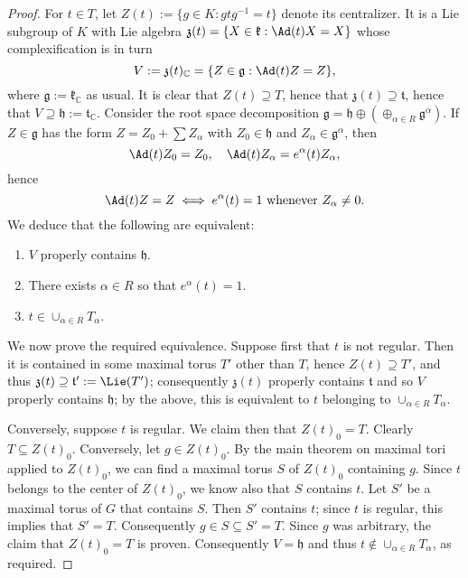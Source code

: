 \documentclass[reqno]{amsart} 
\begin{document}
\begin{proof}
  For $t \in T$, let $Z(t) := \{g \in K : g t g^{-1} = t\}$ denote its centralizer.  It is a Lie subgroup of $K$ with Lie algebra $\mathfrak{z}(t) = \{X \in \mathfrak{k} : \Ad(t)X = X\}$ whose complexification is in turn
  \begin{equation*}
    V := \mathfrak{z}(t)_\mathbb{C} = \{Z \in \mathfrak{g} : \Ad(t)Z = Z\},
  \end{equation*}
  where $\mathfrak{g} := \mathfrak{k}_\mathbb{C}$ as usual.  It is clear that $Z(t) \supseteq T$, hence that $\mathfrak{z}(t) \supseteq \mathfrak{t}$, hence that $V \supseteq \mathfrak{h} := \mathfrak{t}_\mathbb{C}$.  Consider the root space decomposition $\mathfrak{g} = \mathfrak{h} \oplus (\oplus_{\alpha \in R} \mathfrak{g}^\alpha)$.  If $Z \in \mathfrak{g}$ has the form $Z = Z_0 + \sum Z_\alpha$ with $Z_0 \in \mathfrak{h}$ and $Z_\alpha \in \mathfrak{g}^\alpha$, then
  \begin{equation*}
    \Ad(t) Z_0 = Z_0, \quad \Ad(t) Z_\alpha = e^\alpha(t) Z_\alpha,
  \end{equation*}
  hence
  \begin{equation*}
    \Ad(t) Z = Z \iff e^\alpha(t) = 1 \text{ whenever } Z_\alpha \neq 0.
  \end{equation*}
  We deduce that the following are equivalent:
  \begin{enumerate}
  \item $V$ properly contains $\mathfrak{h}$.
  \item There exists $\alpha \in R$ so that $e^\alpha(t) = 1$.
  \item $t \in \cup_{\alpha \in R} T_\alpha$.
  \end{enumerate}

  We now prove the required equivalence.  Suppose first that $t$ is not regular.  Then it is contained in some maximal torus $T'$ other than $T$, hence $Z(t) \supseteq T'$, and thus $\mathfrak{z}(t) \supseteq \mathfrak{t} ' := \Lie(T')$; consequently $\mathfrak{z}(t)$ properly contains $\mathfrak{t}$ and so $V$ properly contains $\mathfrak{h}$; by the above, this is equivalent to $t$ belonging to $\cup_{\alpha \in R} T_\alpha$.

  Conversely, suppose $t$ is regular.  We claim then that $Z(t)_0 = T$.  Clearly $T \subseteq Z(t)_0$.  Conversely, let $g \in Z(t)_0$.  By the main theorem on maximal tori applied to $Z(t)_0$, we can find a maximal torus $S$ of $Z(t)_0$ containing $g$.  Since $t$ belongs to the center of $Z(t)_0$, we know also that $S$ contains $t$.  Let $S'$ be a maximal torus of $G$ that contains $S$.  Then $S'$ contains $t$; since $t$ is regular, this implies that $S' = T$.  Consequently $g \in S \subseteq S' = T$.  Since $g$ was arbitrary, the claim that $Z(t)_0 = T$ is proven.  Consequently $V = \mathfrak{h}$ and thus $t \notin \cup_{\alpha \in R} T_\alpha$, as required.
\end{proof}
\end{document}
